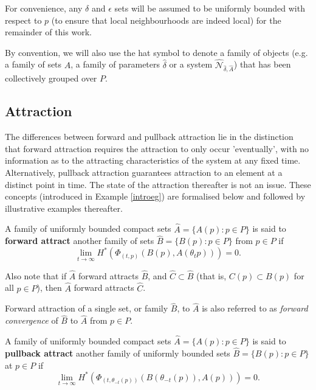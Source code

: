 For convenience, any $\delta$ and $\epsilon$ sets will be assumed to be
uniformly bounded with respect to $p$ (to ensure that local neighbourhoods are indeed local) for the remainder of this work. 

By convention, we will also use the hat symbol to denote a family of objects (e.g. a family of sets $\hat{A}$, a family of parameters $\hat{\delta}$ or a system $\hat{\mathcal{N}}_{\hat{\delta}, \hat{A}}$) that has been collectively grouped over  $P$.

\subsection{Attraction}

The differences between forward and pullback attraction lie in the
distinction that forward attraction requires the attraction to
only occur 'eventually', with no information as to the attracting
characteristics of the system at any fixed time. Alternatively,
pullback attraction guarantees attraction to an element at a
distinct point in time. The state of the attraction thereafter is
not an issue. These concepts (introduced in Example \ref{introeg})
are formalised below and followed by illustrative examples
thereafter.

\begin{defn}
A family of uniformly bounded compact sets $\hat{A} =
\{A(p):p \in P \}$ is said to {\bf forward attract} another family of
sets $\hat{B} = \{B(p):p \in P\}$ from $p \in P$ if
\[ \lim_{t \to \infty} H^{*} \left(\Phi_{(t,p)}
                     (B(p),A(\theta_t p)) \right) = 0. \]
\end{defn}

Also note that if $\hat{A}$ forward attracts $\hat{B}$, and
$\hat{C} \subset \hat{B}$ (that is, $C(p) \subset B(p)$ for all $p \in P$),
then $\hat{A}$ forward attracts $\hat{C}$.

Forward attraction of a single set, or family $\hat{B}$, to $\hat{A}$ is
also referred to as {\em forward convergence} of $\hat{B}$ to $\hat{A}$
from $p \in P$.

\begin{defn}
A family of uniformly bounded compact sets $\hat{A} =
\{A(p):p \in P \}$ is said to {\bf pullback attract} another family of
uniformly bounded sets $\hat{B} = \{B(p):p \in P\}$ at $p \in P$ if
\[ \lim_{t \to \infty} H^{*} \left(\Phi_{(t,\theta_{-t}(p))}
                     (B(\theta_{-t}(p)),A(p)) \right) = 0. \]
\end{defn}

